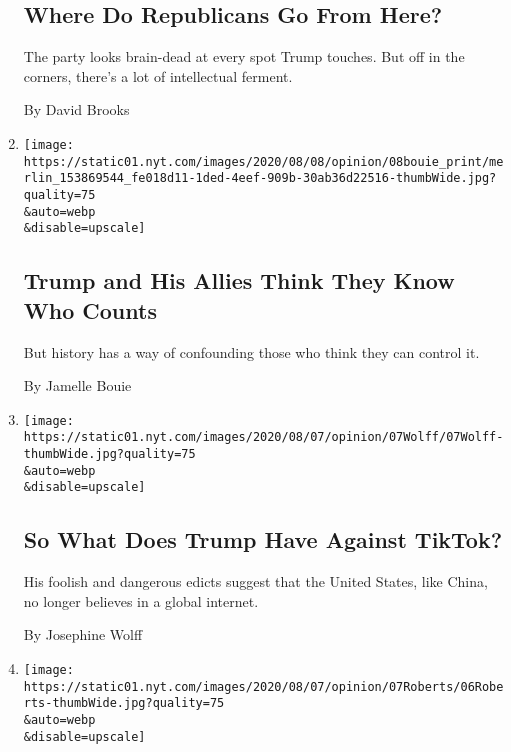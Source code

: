 \begin{enumerate}
  \hypertarget{where-do-republicans-go-from-here}{%
  \subsection{Where Do Republicans Go From
  Here?}\label{where-do-republicans-go-from-here}}

  The party looks brain-dead at every spot Trump touches. But off in the
  corners, there's a lot of intellectual ferment.

  By David Brooks
\item
  \href{/2020/08/07/opinion/trump-2020-census.html}{}

  \texttt{[image: https://static01.nyt.com/images/2020/08/08/opinion/08bouie\_print/merlin\_153869544\_fe018d11-1ded-4eef-909b-30ab36d22516-thumbWide.jpg?quality=75\\\&auto=webp\\\&disable=upscale]}

  \hypertarget{trump-and-his-allies-think-they-know-who-counts}{%
  \subsection{Trump and His Allies Think They Know Who
  Counts}\label{trump-and-his-allies-think-they-know-who-counts}}

  But history has a way of confounding those who think they can control
  it.

  By Jamelle Bouie
\item
  \href{/2020/08/07/opinion/tiktok-wechat-china-trump-executive-order.html}{}

  \texttt{[image: https://static01.nyt.com/images/2020/08/07/opinion/07Wolff/07Wolff-thumbWide.jpg?quality=75\\\&auto=webp\\\&disable=upscale]}

  \hypertarget{so-what-does-trump-have-against-tiktok}{%
  \subsection{So What Does Trump Have Against
  TikTok?}\label{so-what-does-trump-have-against-tiktok}}

  His foolish and dangerous edicts suggest that the United States, like
  China, no longer believes in a global internet.

  By Josephine Wolff
\item
  \href{/2020/08/06/opinion/nixon-trump-protests-military.html}{}

  \texttt{[image: https://static01.nyt.com/images/2020/08/07/opinion/07Roberts/06Roberts-thumbWide.jpg?quality=75\\\&auto=webp\\\&disable=upscale]}


\end{enumerate}
